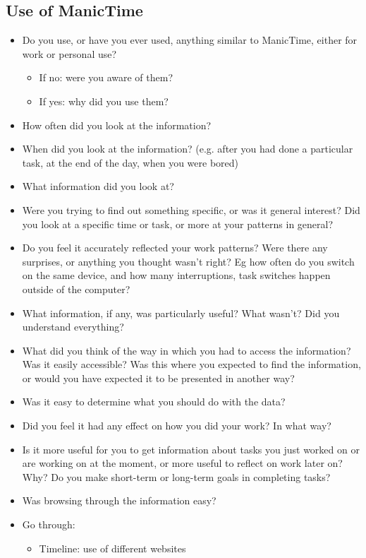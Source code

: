 \subsection{Use of ManicTime}
\begin{itemize}
\item Do you use, or have you ever used, anything similar to ManicTime, either for work or personal use? 
\begin{itemize}
\item If no: were you aware of them?
\item If yes: why did you use them? 
\end{itemize}
\item How often did you look at the information?
\item When did you look at the information? (e.g. after you had done a particular task, at the end of the day, when you were bored)
\item What information did you look at?
\item Were you trying to find out something specific, or was it general interest? Did you look at a specific time or task, or more at your patterns in general?
\item Do you feel it accurately reflected your work patterns? Were there any surprises, or anything you thought wasn't right? Eg how often do you switch on the same device, and how many interruptions, task switches happen outside of the computer?
\item What information, if any, was particularly useful? What wasn't? Did you understand everything?
\item What did you think of the way in which you had to access the information? Was it easily accessible? Was this where you expected to find the information, or would you have expected it to be presented in another way?
\item Was it easy to determine what you should do with the data?
\item Did you feel it had any effect on how you did your work? In what way?
\item Is it more useful for you to get information about tasks you just worked on or are working on at the moment, or more useful to reflect on work later on? Why? Do you make short-term or long-term goals in completing tasks?
\item Was browsing through the information easy?
\item Go through:
\begin{itemize}
\item Timeline: use of different websites

\end{itemize}
\end{itemize}
